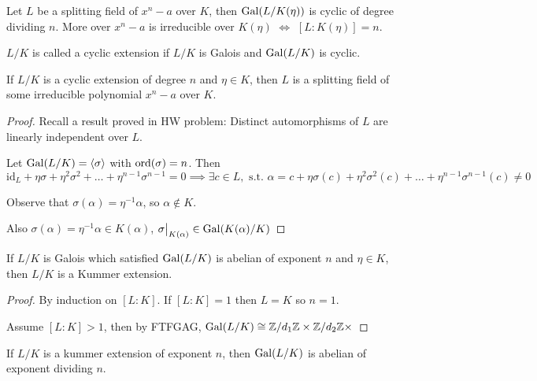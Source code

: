 \begin{theorem}
  Let $L$ be a splitting field of $x^n - a$ over $K$, then $\operatorname{Gal}(L / K(\eta))$ is cyclic of
  degree dividing $n$. More over $x^n - a$ is irreducible over $K(\eta)$ $\iff$ $[L: K(\eta)] = n$.
\end{theorem}

\begin{definition}
  $L/K$ is called a cyclic extension if $L/K$ is Galois and $\operatorname{Gal}(L/K)$ is cyclic.
\end{definition}

\begin{theorem}
  If $L/K$ is a cyclic extension of degree $n$ and $\eta \in K$, then $L$ is a splitting field of
  some irreducible polynomial $x^n - a$ over $K$.

  \begin{proof}
    Recall a result proved in HW problem: Distinct automorphisms of $L$ are linearly independent over $L$.
    
    Let $\operatorname{Gal}(L/K) = \langle \sigma \rangle$ with $\operatorname{ord}(\sigma) = n$. Then
    \[ \text{id}_L + \eta \sigma + \eta^2 \sigma^2 + \dots + \eta^{n-1} \sigma^{n-1} = 0
      \implies \exists c \in L, \text{ s.t. } \alpha = c + \eta \sigma(c) + \eta^2 \sigma^2(c)
      + \dots + \eta^{n-1} \sigma^{n-1}(c) \neq 0 \]

    Observe that $\sigma(\alpha) = \eta^{-1} \alpha$, so $\alpha \not\in K$.

    Also $\sigma(\alpha) = \eta^{-1}\alpha \in K(\alpha)$, $\sigma\big|_{K(\alpha)} \in \operatorname{Gal}(K(\alpha) / K)$
  \end{proof}
\end{theorem}

\begin{theorem}
  If $L/K$ is Galois which satisfied $\operatorname{Gal}(L/K)$ is abelian of exponent $n$ and $\eta \in K$,
  then $L/K$ is a Kummer extension.

  \begin{proof}
    By induction on $[L: K]$. If $[L: K] = 1$ then $L = K$ so $n = 1$.

    Assume $[L: K] > 1$, then by FTFGAG, $\operatorname{Gal}(L/K) \cong {\mathbb{Z}}/{d_1 \mathbb{Z}}
    \times {\mathbb{Z}}/{d_2 \mathbb{Z}} \times $
  \end{proof}
\end{theorem}

\begin{theorem}
  If $L/K$ is a kummer extension of exponent $n$, then $\operatorname{Gal}(L/K)$ is abelian of exponent dividing $n$.
\end{theorem}

